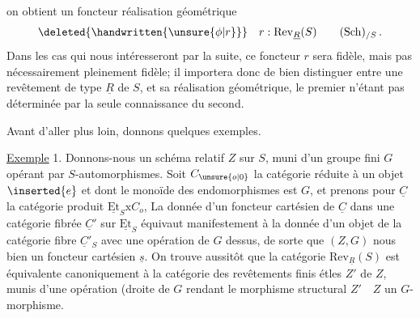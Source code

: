  on obtient un foncteur réalisation géométrique
\[
\deleted{\handwritten{\unsure{\phi|r}}}\quad r:\mathrm{Rev}_{\underline{R}}(S)\qquad(\mathrm{Sch})_{/S}\,.
\]
Dans les cas qui nous intéresseront par la suite, ce foncteur $r$ sera fidèle, mais pas nécessairement pleinement fidèle; il importera donc de bien distinguer entre une revêtement de type $\underline{R}$ de $S$, et sa réalisation géométrique, le premier n'étant pas déterminée par la seule connaissance du second.

Avant d'aller plus loin, donnons quelques exemples.

\uline{Exemple} 1. Donnons-nous un schéma relatif $Z$ sur $S$, muni d'un groupe fini $G$ opérant  par $S$-automorphismes. Soit $C_{\unsure{o|0}}$ la catégorie réduite à un objet $\inserted{e}$ et dont le monoïde des endomorphismes est $G$, et prenons pour $\underline{C}$ la catégorie produit $\underline{\mathrm{Et}}_S\mathrm{x}C_o$,  La donnée d'un foncteur cartésien de  $\underline{C}$ dans une catégorie fibrée $\underline{C}'$ sur $\underline{\mathrm{Et}}_S$ équivaut manifestement à la donnée d'un objet de la catégorie fibre $\underline{C}'_S$ avec une opération de $G$ dessus, de sorte que $(Z,G)$ nous  bien un foncteur cartésien $\underline{s}$. On trouve aussitôt que la catégorie $\mathrm{Rev}_{\underline{R}}(S)$ est équivalente canoniquement à la  catégorie des revêtements finis étles $Z'$ de $Z$, munis d'une opération (droite de $G$  rendant le morphisme structural $Z'\quad Z$ un $G$-morphisme.
